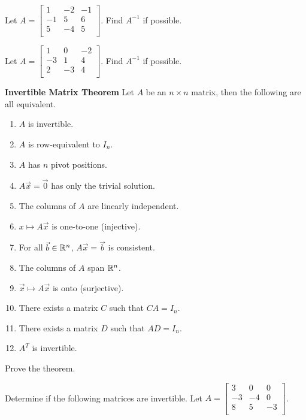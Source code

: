 \documentclass[12pt,letterpaper]{article}
\begin{document}
\begin{enumerate}

\Problem 
\Part Let $A=\begin{bmatrix}
1 & -2 & -1\\
-1 &5 & 6\\
5 &-4 & 5\\
\end{bmatrix}$. Find $A^{-1}$ if possible.

\vfill

\Part Let $A=\begin{bmatrix}
1 & 0 & -2\\
-3 &1 & 4\\
2 &-3 & 4\\
\end{bmatrix}$. Find $A^{-1}$ if possible.

\vfill

\newpage

{\bf Invertible Matrix Theorem} Let $A$ be an $n \times n$ matrix, then the following are all equivalent.
\begin{enumerate}
\item $A$ is invertible.
\item $A$ is row-equivalent to $I_n$.
\item $A$ has $n$ pivot positions.
\item $A\vec{x}=\vec{0}$ has only the trivial solution.
\item The columns of $A$ are linearly independent.
\item $x\mapsto A\vec{x}$ is one-to-one (injective).
\item For all $\vec{b}\in \mathbb{R}^n$, $A\vec{x}=\vec{b}$ is consistent.
\item The columns of $A$ span $\mathbb{R}^n$.
\item $\vec{x} \mapsto A\vec{x}$ is onto (surjective).
\item There exists a matrix $C$ such that $CA=I_n$.
\item There exists a matrix $D$ such that $AD=I_n$.
\item $A^{T}$ is invertible.
\end{enumerate}

\Problem Prove the theorem.

\newpage

\Problem Determine if the following matrices are invertible.
\Part Let $A=\begin{bmatrix}
3 & 0 & 0\\
-3 &-4 & 0\\
8 & 5 & -3\\
\end{bmatrix}$.


\end{enumerate}
\end{document}
